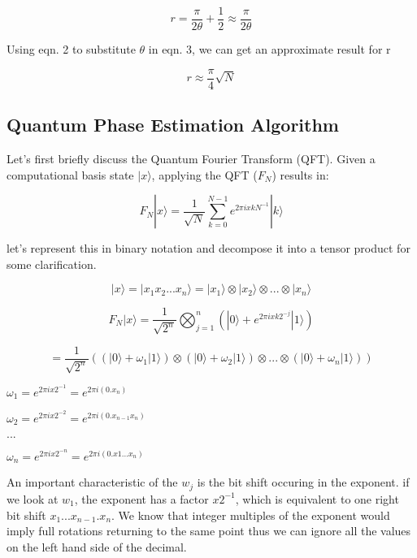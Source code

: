 \documentclass[twocolumn,showpacs,preprintnumbers,amsmath,amssymb]{revtex4}
\begin{document}
		\begin{equation}
			r = \frac{\pi}{2\theta} + \frac{1}{2} \approx \frac{\pi}{2\theta}
		\end{equation}
		
		Using eqn. 2 to substitute $\theta$ in eqn. 3, we can get an approximate result for r
		
		\begin{equation}
			r \approx \frac{\pi}{4}\sqrt{N}
		\end{equation}
		
		
		\subsection{Quantum Phase Estimation Algorithm}
		
		Let's first briefly discuss the Quantum Fourier Transform (QFT). Given a computational basis state $|x\rangle$, applying the QFT ($F_N$) results in:
		
		$$ F_N |x \rangle = \frac{1}{\sqrt{N}} \sum_{k=0}^{N-1} e^{2\pi i x k N^{-1}} |k\rangle $$
		
		let's represent this in binary notation and decompose it into a tensor product for some clarification.
		
		$$|x\rangle = |x_1x_2 ... x_n\rangle =  |x_1\rangle \otimes |x_2\rangle \otimes ... \otimes |x_n\rangle$$
		
		\begin{center}
		$$ F_N |x \rangle = \frac{1}{\sqrt{2^n}} \bigotimes_{j=1}^n (|0\rangle +  e^{2\pi i x k 2^{-j}} |1\rangle)$$
		
		$$= \frac{1}{\sqrt{2^n}} ((|0\rangle + \omega_1|1\rangle)  \otimes(|0\rangle + \omega_2|1\rangle)\otimes ... \otimes(|0\rangle + \omega_n|1\rangle))$$
	    
		$\omega_1 = e^{2\pi i x 2^{-1}} =  e^{2\pi i (0.x_n)}$
		
		$\omega_2 = e^{2\pi i x 2^{-2}} =  e^{2\pi i (0.x_{n-1}x_n)}$
		
		$...$
		
		$\omega_n = e^{2\pi i x 2^{-n}} =  e^{2\pi i (0.x1...x_n)}$
		
		An important characteristic of the $w_j$ is the bit shift occuring in the exponent. if we look at $w_1$, the exponent has a factor $x 2^{-1}$, which is equivalent to one right bit shift $x_1...x_{n-1}.x_n$.  We know that integer multiples of the exponent would imply full rotations returning to the same point thus we can ignore all the values on the left hand side of the decimal. 
		
		
	    \end{center}
		
\end{document}
